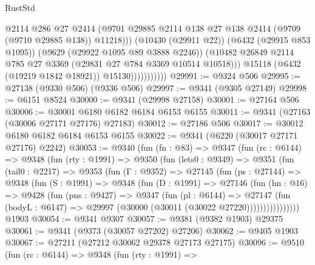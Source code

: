 \begin{lexlean}{RustStd}
\begin{coremodule}
                                @2114
                                @286
                                @27
                                @2414
                                (@9701
                                  @29885
                                  @2114
                                  @138
                                  @27
                                  @138
                                  @2414
                                  (@9709 (@9710 @29885 @138))
                                  @11218)))
                            (@10430 (@29911 @22))
                            (@6432 (@29915 @853 @1095))
                            (@9629 (@29922 @1095 @89 @3888 @2246))
                            (@10482
                              @26849
                              @2114
                              @785
                              @27
                              @3369
                              (@29831 @27 @784 @3369 @10514 @10518)))
                          @15118
                          (@6432 (@19219 @1842 @18921))
                          @15130)))))))))))
@29991 := @9324 @506
@29995 := @27138 (@9330 @506) (@9336 @506)
@29997 := @9341 (@9305 @27149)
@29998 := @6151 @8524
@30000 := @9341 (@29998 @27158)
@30001 := @27164 @506
@30006 := @30001 @6180 @6182 @6184 @6153 @6155
@30011 := @9341 (@27163 (@30006 @27171 @27176) @27183)
@30012 := @27186 @506
@30017 := @30012 @6180 @6182 @6184 @6153 @6155
@30022 := @9341 (@6220 (@30017 @27171 @27176) @2242)
@30053 := @9340
    (fun (fn : @83) =>
    @9347
      (fun (rc : @6144) =>
      @9348
        (fun (rty : @1991) =>
        @9350
          (fun (lets0 : @9349) =>
          @9351
            (fun (tail0 : @2217) =>
            @9353
              (fun (Γ : @9352) =>
              @27145
                (fun (ps : @27144) =>
                @9348
                  (fun (S : @1991) =>
                  @9348
                    (fun (D : @1991) =>
                    @27146
                      (fun (hn : @16) =>
                      @9428
                        (fun (pns : @9427) =>
                        @9347
                          (fun (pl : @6144) =>
                          @27147
                            (fun (bodyL : @6147) =>
                            @29997 (@30000 (@30011 (@30022 @27220))))))))))))))))
    @1903
@30054 := @9341 @9307
@30057 := @9381 (@9382 @1903) @29375
@30061 := @9341 (@9373 (@30057 @27202) @27206)
@30062 := @9405 @1903
@30067 := @27211 (@27212 @30062 @29378 @27173 @27175)
@30096 := @9510
    (fun (rc : @6144) =>
    @9348
      (fun (rty : @1991) =>

\end{coremodule}
\end{lexlean}
